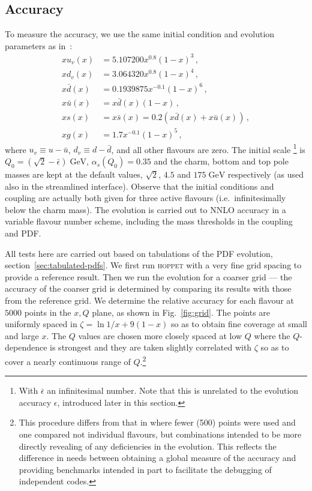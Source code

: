 \documentclass[12pt]{article}
\newcommand{\lp}{\left(}
\newcommand{\rp}{\right)}
\newcommand{\GeV}{\;\mathrm{GeV}}
\newcommand{\as}{\alpha_s}
\newcommand{\ie}{i.e.\ }
\newcommand{\hoppet}{\textsc{hoppet}\xspace}
\begin{document}
\subsection{Accuracy}
\label{sec:Accuracy}
To measure the accuracy, 
we use the same initial condition and evolution parameters as
in~\cite{Benchmarks}:
\begin{subequations}
  \label{eq:init}
  \begin{align}
    x u_v(x)   &= 5.107200 x^{0.8} (1-x)^3\,,\\
    x d_v(x)   &= 3.064320 x^{0.8} (1-x)^4\,,\\
    x\bar d(x) &= 0.1939875 x^{-0.1} (1-x)^6\,,\\
    x\bar u(x) &= x\bar d(x) (1-x)\,,\\
    x     s(x) &= x\bar s(x) = 0.2(x\bar d(x) + x\bar u(x))\,,\\
    x g(x) &= 1.7 x^{-0.1} (1-x)^5\,,
  \end{align}
\end{subequations}
where $u_v \equiv u - \bar u$, $d_v \equiv d - \bar d$, and all other
flavours are zero. The initial scale%
\footnote{With $\bar{\epsilon}$ an infinitesimal number. Note that
this is unrelated to the evolution accuracy $\epsilon$, introduced later
in this section.} is $Q_0 = \lp \sqrt{2}-\bar{\epsilon}
\rp \GeV$,
$\as(Q_0) = 0.35$ and the charm, bottom and top pole masses are kept
at the default values, $\sqrt{2}$, $4.5$ and $175\GeV$ respectively
(as used also in the streamlined interface).
Observe that the initial conditions 
and coupling are actually both given for three active
flavours (\ie infinitesimally below the charm mass). The evolution is
carried out to NNLO accuracy in a variable flavour number scheme,
including the mass thresholds in the coupling and PDF.

All tests here are carried out based on tabulations of the PDF
evolution, section~\ref{sec:tabulated-pdfs}.
%
We first run \hoppet with a very fine grid spacing to provide a
reference result. Then we run the evolution for a coarser grid ---
the accuracy of the coarser grid is determined by comparing its
results with those from the reference grid. We determine the relative
accuracy for each flavour at $5000$ points in the $x, Q$ plane, as
shown in Fig.~\ref{fig:grid}. The points are uniformly spaced in
$\zeta = \ln 1/x + 9(1-x)$ so as to obtain fine coverage at small and
large $x$. The $Q$ values are chosen more closely spaced at low $Q$
where the $Q$-dependence is strongest and they are taken slightly correlated
with $\zeta$ so as to cover a nearly continuous range of
$Q$.\footnote{This procedure differs from that in \cite{Benchmarks}
  where fewer (500) points were used and one compared not individual
  flavours, but combinations intended to be more directly revealing of
  any deficiencies in the evolution. This reflects the difference in
  needs between obtaining a global measure of the accuracy and
  providing benchmarks intended in part to facilitate the debugging of
  independent codes.}
\end{document}
